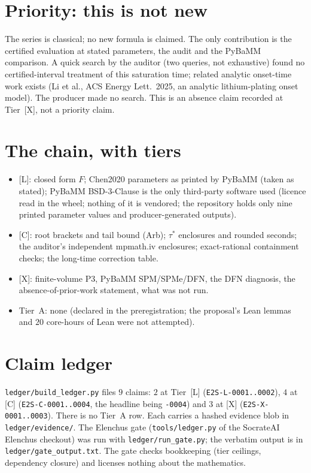 \documentclass[10pt]{article}
\newcommand{\tier}[1]{\textsf{[#1]}}
\newcommand{\tL}{\tier{L}}
\newcommand{\tC}{\tier{C}}
\newcommand{\tX}{\tier{X}}
\begin{document}
\section{Priority: this is not new}\label{sec:prior}
The series is classical; no new formula is claimed. The only contribution is the certified evaluation at stated parameters, the audit and the PyBaMM comparison. A quick search by the auditor (two queries, not exhaustive) found no certified-interval treatment of this saturation time; related analytic onset-time work exists (Li et al., ACS Energy Lett.\ 2025, an analytic lithium-plating onset model). The producer made no search. This is an absence claim recorded at Tier~\tX{}, not a priority claim.

\section{The chain, with tiers}\label{sec:tiers}
\begin{itemize}\itemsep=1pt
\item \tL{}: closed form $F$; Chen2020 parameters as printed by PyBaMM (taken as stated); PyBaMM BSD-3-Clause is the only third-party software used (licence read in the wheel; nothing of it is vendored; the repository holds only nine printed parameter values and producer-generated outputs).
\item \tC{}: root brackets and tail bound (Arb); $\tau^*$ enclosures and rounded seconds; the auditor's independent mpmath.iv enclosures; exact-rational containment checks; the long-time correction table.
\item \tX{}: finite-volume P3, PyBaMM SPM/SPMe/DFN, the DFN diagnosis, the absence-of-prior-work statement, what was not run.
\item Tier~A: none (declared in the preregistration; the proposal's Lean lemmas and $20$ core-hours of Lean were not attempted).
\end{itemize}

\section{Claim ledger}\label{sec:ledger}
\texttt{ledger/build\_ledger.py} files $9$ claims: $2$ at Tier~\tL{} (\texttt{E2S-L-0001..0002}), $4$ at \tC{} (\texttt{E2S-C-0001..0004}, the headline being \texttt{-0004}) and $3$ at \tX{} (\texttt{E2S-X-0001..0003}). There is no Tier~A row. Each carries a hashed evidence blob in \texttt{ledger/evidence/}. The Elenchus gate (\texttt{tools/ledger.py} of the SocrateAI Elenchus checkout) was run with \texttt{ledger/run\_gate.py}; the verbatim output is in \texttt{ledger/gate\_output.txt}. The gate checks bookkeeping (tier ceilings, dependency closure) and licenses nothing about the mathematics.
\end{document}
